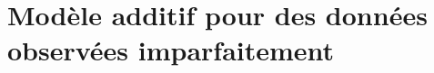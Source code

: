 \chapter{Modèle additif pour des données observées imparfaitement}
{   
    \minitoc%
    
    \section{}
    
    \section{}
    
    \section{}
    
    \section{}
    
    \section{}
    
}